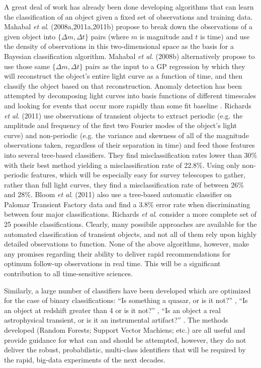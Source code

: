 \documentclass[useAMS,usenatbib,tightenlines,11pt,preprint]{aastex}
\begin{document}
A great deal of work has
already been done developing algorithms that can learn the classification of an
object given a fixed set of observations and training data.  
Mahabal {\it et al}. (2008a,2011a,2011b) propose to break down the
observations of a given object into $\{\Delta m,\Delta t\}$ pairs (where $m$
is magnitude and $t$ is time) and use the density of observations in this 
two-dimensional space as the basis for a Bayesian classification algorithm.
Mahabal {\it et al}. (2008b) alternatively propose to use those same 
$\{\Delta m,\Delta t\}$ pairs as the input to a GP regression
by which they will reconstruct the object's entire light curve as a function
of time, and then classify the object based on that reconstruction.
Anomaly detection has been attempted by decomposing light curves into
basis functions of different timescales and looking for events that occur
more rapidly than some fit baseline \cite{preston2009,blocker2013}.
Richards {\it et al}. (2011) use observations of transient objects to extract
periodic (e.g. the amplitude and frequency of the first two Fourier modes of
the object's light curve) and non-periodic (e.g. the variance and skewness of
all of the magnitude observations taken, regardless of their separation in
time) and feed those features into several tree-based classifiers.
They find misclassification rates lower than 30\% with their best method yielding a
misclassification rate of 22.8\%.  Using only non-periodic features, which will be
especially easy for survey telescopes to gather, rather than
full light curves, they 
find a misclassification rate of
between 26\% and 28\%.
Bloom {\it et al}. (2011) also use a tree-based automatic classifier on
Palomar Transient Factory data and find a 3.8\% error rate when
discriminating between four major classifications.  Richards {\it et al}.
consider a more complete set of 25 possible classifications.
Clearly, many possibile approaches are available for the automated
classification of transient objects, and not all of them rely upon highly
detailed observations to function.  
None of the above algorithms, however, make
any promises regarding their ability to deliver rapid recommendations for
optimum follow-up observations in real time.  This will be a significant
contribution to all time-sensitive sciences.

Similarly, a large number of classifiers have been developed which are optimized
for the case of binary classifications: ``Is something a quasar, or is it not?''
\cite{kim2011,pichara2012}, ``Is an object at redshift greater than 4 or is it
not?'' \cite{morgan2011}, ``Is an object a real astrophysical transient, or is
it an instrumental artifact?'' \cite{brink2012}.  The methods developed
(Random Forests; Support Vector Machiens; etc.) are all useful
and provide guidance for what can and should be attempted, however, they do not
deliver the robust, probabilistic, multi-class identifiers that will be required
by the rapid, big-data experiments of the next decades.
\end{document}
